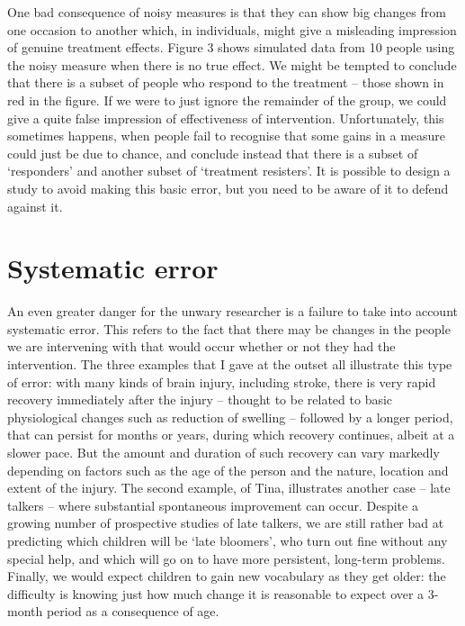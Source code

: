\documentclass[]{book}
\begin{document}
One bad consequence of noisy measures is that they can show big changes from one occasion to another which, in individuals, might give a misleading impression of genuine treatment effects. Figure 3 shows simulated data from 10 people using the noisy measure when there is no true effect. We might be tempted to conclude that there is a subset of people who respond to the treatment -- those shown in red in the figure. If we were to just ignore the remainder of the group, we could give a quite false impression of effectiveness of intervention. Unfortunately, this sometimes happens, when people fail to recognise that some gains in a measure could just be due to chance, and conclude instead that there is a subset of `responders' and another subset of `treatment resisters'. It is possible to design a study to avoid making this basic error, but you need to be aware of it to defend against it.

\hypertarget{systematic-error}{%
\section{Systematic error}\label{systematic-error}}

An even greater danger for the unwary researcher is a failure to take into account systematic error. This refers to the fact that there may be changes in the people we are intervening with that would occur whether or not they had the intervention. The three examples that I gave at the outset all illustrate this type of error: with many kinds of brain injury, including stroke, there is very rapid recovery immediately after the injury -- thought to be related to basic physiological changes such as reduction of swelling -- followed by a longer period, that can persist for months or years, during which recovery continues, albeit at a slower pace. But the amount and duration of such recovery can vary markedly depending on factors such as the age of the person and the nature, location and extent of the injury. The second example, of Tina, illustrates another case -- late talkers -- where substantial spontaneous improvement can occur. Despite a growing number of prospective studies of late talkers, we are still rather bad at predicting which children will be `late bloomers', who turn out fine without any special help, and which will go on to have more persistent, long-term problems. Finally, we would expect children to gain new vocabulary as they get older: the difficulty is knowing just how much change it is reasonable to expect over a 3-month period as a consequence of age.
\end{document}
